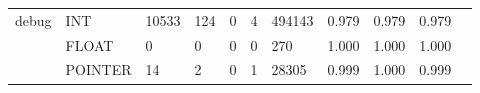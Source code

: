 \begin{table*}[t]
\begin{tabular}{lp{1.2cm}p{1.2cm}p{1.2cm}p{1.2cm}p{1.2cm}p{1.2cm}p{1.2cm}p{1.2cm}p{1.2cm}p{1.2cm}}
\cline{1-10}
\multirow{3}{*}{debug} & INT &                              10533 &                               124 &                                0 &                                 4 &                          494143 &                           0.979 &                                  0.979 &                                0.979 \\
      & FLOAT &                                  0 &                                 0 &                                0 &                                 0 &                             270 &                           1.000 &                                  1.000 &                                1.000 \\
      & POINTER &                                 14 &                                 2 &                                0 &                                 1 &                           28305 &                           0.999 &                                  1.000 &                                0.999 \\
\bottomrule
\end{tabular}
\end{table*}
